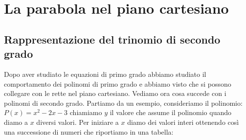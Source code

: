 


\chapter{La parabola nel piano cartesiano}

\section{Rappresentazione del trinomio di secondo grado}
\label{sec:parabola_rappresentazionetrinomio}

Dopo aver studiato le equazioni di primo grado abbiamo studiato il 
comportamento dei polinomi di primo grado e abbiamo visto che si possono 
collegare con le rette nel piano cartesiano. Vediamo ora cosa succede con i
polinomi di secondo grado. Partiamo da un esempio, consideriamo il polinomio: 
$P(x)=x^2 -2x -3$ chiamiamo $y$ il valore che assume il polinomio quando diamo 
a $x$ diversi valori. Per iniziare a $x$ diamo dei valori interi ottenendo così 
una successione di numeri che riportiamo in una tabella:

